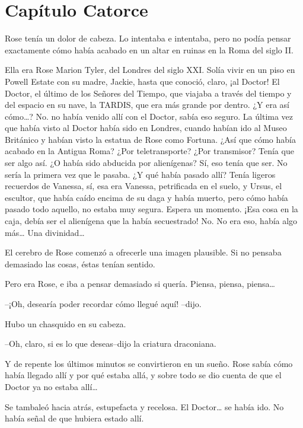 \chapter*{Capítulo Catorce}

Rose tenía un dolor de cabeza. Lo intentaba e intentaba, pero no podía
pensar exactamente cómo había acabado en un altar en ruinas en la Roma
del siglo II.

Ella era Rose Marion Tyler, del Londres del siglo XXI. Solía vivir en un
piso en Powell Estate con su madre, Jackie, hasta que conoció, claro,
¡al Doctor! El Doctor, el último de los Señores del Tiempo, que viajaba
a través del tiempo y del espacio en su nave, la TARDIS, que era más
grande por dentro. ¿Y era así cómo\ldots{}? No. no había venido allí con
el Doctor, sabía eso seguro. La última vez que había visto al Doctor
había sido en Londres, cuando habían ido al Museo Británico y habían
visto la estatua de Rose como Fortuna. ¿Así que cómo había acabado en la
Antigua Roma? ¿Por teletransporte? ¿Por transmisor? Tenía que ser algo
así. ¿O había sido abducida por alienígenas? Sí, eso tenía que ser. No
sería la primera vez que le pasaba. ¿Y qué había pasado allí? Tenía
ligeros recuerdos de Vanessa, sí, esa era Vanessa, petrificada en el
suelo, y Ursus, el escultor, que había caído encima de su daga y había
muerto, pero cómo había pasado todo aquello, no estaba muy segura.
Espera un momento. ¡Esa cosa en la caja, debía ser el alienígena que la
había secuestrado! No. No era eso, había algo más\ldots{} Una
divinidad\ldots{}

El cerebro de Rose comenzó a ofrecerle una imagen plausible. Si no
pensaba demasiado las cosas, éstas tenían sentido.

Pero era Rose, e iba a pensar demasiado si quería. Piensa, piensa,
piensa\ldots{}

--¡Oh, desearía poder recordar cómo llegué aquí! --dijo.

Hubo un chasquido en su cabeza.

--Oh, claro, si es lo que deseas--dijo la criatura draconiana.

Y de repente los últimos minutos se convirtieron en un sueño. Rose sabía
cómo había llegado allí y por qué estaba allá, y sobre todo se dio
cuenta de que el Doctor ya no estaba allí\ldots{}

Se tambaleó hacia atrás, estupefacta y recelosa. El Doctor\ldots{} se
había ido. No había señal de que hubiera estado allí.

